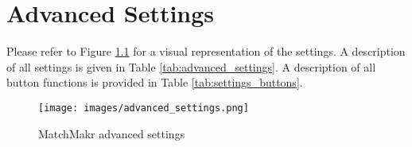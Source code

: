 \chapter{Advanced Settings}


\renewcommand{\arraystretch}{1}
\renewcommand{\pb}[1]{\parbox[t]{0.15\textwidth}{#1}}




%
%
Please refer to Figure \ref{fig:advanced_settings} for a visual representation of the settings.  A description of all settings is given in Table \ref{tab:advanced_settings}.  A description of all button functions is provided in Table \ref{tab:settings_buttons}.



%
%
\begin{figure}
	\centering
	\texttt{[image: images/advanced\_settings.png]}
	\caption{\label{fig:advanced_settings} MatchMakr advanced settings}
\end{figure}


